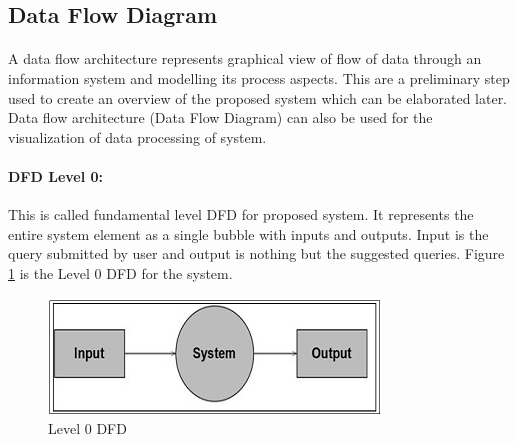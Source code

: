 \begin{enumerate}
\begin{itemize}
		
		
	\end{itemize}
\end{enumerate}


\subsection{Data Flow Diagram}
\paragraph{}A data flow architecture represents graphical view of flow of data through an information system and modelling its process aspects. This are a preliminary step used to create an overview of the proposed system which can be elaborated later. Data flow architecture (Data Flow Diagram) can also be used for the visualization of data processing of system.\\

\paragraph{DFD Level 0: }This is called fundamental level DFD for proposed system. It represents the entire system element as a single bubble with inputs and outputs. Input is the query submitted by user and output is nothing but the suggested queries. Figure \ref{fig:DFD0} is the Level 0 DFD for the system.\\
\begin{figure}[!h]
	\centering
	\includegraphics[width=0.725\linewidth]{./dfd0}
		\caption[Level 0 DFD]{Level 0 DFD}
		\label{fig:DFD0}
\end{figure}



